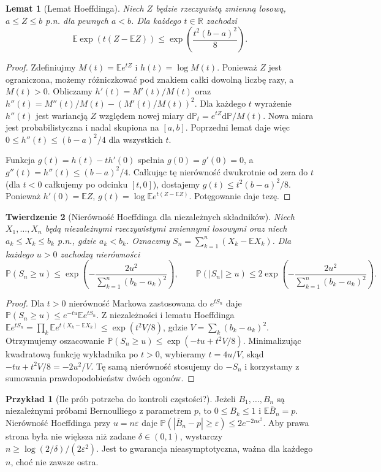 \documentclass[11pt,a4paper,oneside]{report}
\numberwithin{equation}{chapter}
\theoremstyle{plain}
\newtheorem{twierdzenie}{Twierdzenie}[chapter]
\newtheorem{lemat}[twierdzenie]{Lemat}
\theoremstyle{definition}
\newtheorem{przyklad}{Przykład}[chapter]
\theoremstyle{remark}
\newcommand{\R}{\mathbb{R}}
\newcommand{\Prob}{\mathbb{P}}
\newcommand{\E}{\mathbb{E}}
\newcommand{\dd}{\mathrm{d}}
\begin{document}
\begin{lemat}[Lemat Hoeffdinga]
Niech $Z$ będzie rzeczywistą zmienną losową,
$a\leq Z\leq b$ p.n. dla pewnych $a<b$.
Dla każdego $t\in\R$ zachodzi
\[
\E\exp(t(Z-\E Z))
\leq\exp\left(\frac{t^2(b-a)^2}{8}\right).
\]
\end{lemat}
\begin{proof}
Zdefiniujmy $M(t)=\E e^{tZ}$ i
$h(t)=\log M(t)$. Ponieważ $Z$ jest ograniczona,
możemy różniczkować pod znakiem całki dowolną
liczbę razy, a $M(t)>0$. Obliczamy
$h'(t)=M'(t)/M(t)$ oraz
$h''(t)=M''(t)/M(t)-(M'(t)/M(t))^2$.
Dla każdego $t$ wyrażenie $h''(t)$ jest
wariancją $Z$ względem nowej miary
$\dd\Prob_t=e^{tZ}\dd\Prob/M(t)$. Nowa miara jest
probabilistyczna i nadal skupiona na $[a,b]$.
Poprzedni lemat daje więc
$0\leq h''(t)\leq(b-a)^2/4$ dla wszystkich $t$.

Funkcja $g(t)=h(t)-th'(0)$ spełnia $g(0)=g'(0)=0$,
a $g''(t)=h''(t)\leq(b-a)^2/4$.
Całkując tę nierówność dwukrotnie od zera do $t$
(dla $t<0$ całkujemy po odcinku $[t,0]$),
dostajemy $g(t)\leq t^2(b-a)^2/8$.
Ponieważ $h'(0)=\E Z$,
$g(t)=\log\E e^{t(Z-\E Z)}$.
Potęgowanie daje tezę.
\end{proof}

\begin{twierdzenie}[Nierówność Hoeffdinga dla niezależnych składników]
Niech $X_1,\ldots,X_n$ będą niezależnymi rzeczywistymi
zmiennymi losowymi oraz niech $a_k\leq X_k\leq b_k$
p.n., gdzie $a_k<b_k$. Oznaczmy
$S_n=\sum_{k=1}^n(X_k-\E X_k)$.
Dla każdego $u>0$ zachodzą nierówności
\[
\Prob(S_n\geq u)\leq
\exp\left(-\frac{2u^2}{\sum_{k=1}^n(b_k-a_k)^2}\right),
\qquad
\Prob(|S_n|\geq u)\leq
2\exp\left(-\frac{2u^2}{\sum_{k=1}^n(b_k-a_k)^2}\right).
\]
\end{twierdzenie}
\begin{proof}
Dla $t>0$ nierówność Markowa zastosowana
do $e^{tS_n}$ daje
$\Prob(S_n\geq u)\leq e^{-tu}\E e^{tS_n}$.
Z niezależności i lematu Hoeffdinga
$\E e^{tS_n}=\prod_k\E e^{t(X_k-\E X_k)}
\leq\exp(t^2V/8)$,
gdzie $V=\sum_k(b_k-a_k)^2$.
Otrzymujemy oszacowanie
$\Prob(S_n\geq u)\leq\exp(-tu+t^2V/8)$.
Minimalizując kwadratową funkcję wykładnika po $t>0$,
wybieramy $t=4u/V$, skąd $-tu+t^2V/8=-2u^2/V$.
Tę samą nierówność stosujemy do $-S_n$ i korzystamy
z sumowania prawdopodobieństw dwóch ogonów.
\end{proof}

\begin{przyklad}[Ile prób potrzeba do kontroli częstości?]
Jeżeli $B_1,\ldots,B_n$ są niezależnymi próbami
Bernoulliego z parametrem $p$, to $0\leq B_k\leq1$
i $\E\overline B_n=p$. Nierówność Hoeffdinga
przy $u=n\varepsilon$ daje
$\Prob(|\overline B_n-p|\geq\varepsilon)
\leq2e^{-2n\varepsilon^2}$.
Aby prawa strona była nie większa niż zadane
$\delta\in(0,1)$, wystarczy
$n\geq\log(2/\delta)/(2\varepsilon^2)$.
Jest to gwarancja nieasymptotyczna, ważna dla
każdego $n$, choć nie zawsze ostra.
\end{przyklad}
\end{document}
